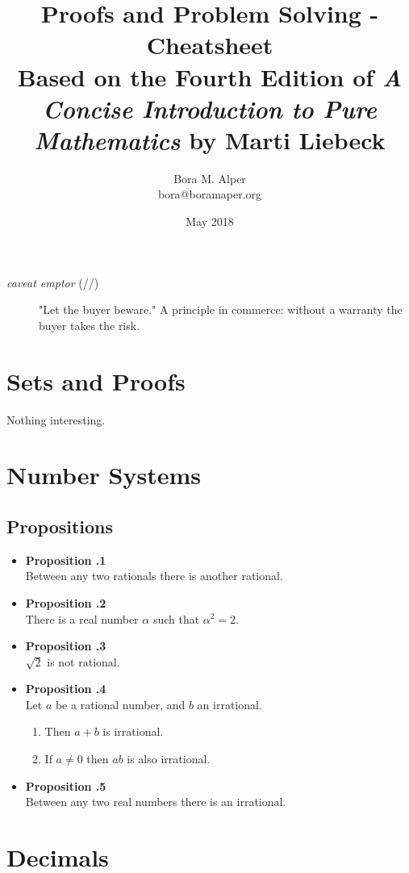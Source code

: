 \documentclass[a4paper,12pt]{article}
\title{Proofs and Problem Solving - Cheatsheet \\
\large Based on the Fourth Edition of \textit{A Concise Introduction to Pure Mathematics} by Marti Liebeck}
\author{Bora M. Alper\\bora@boramaper.org}
\date{May 2018}
\newcommand{\prop}[1]{
    \item \textbf{Proposition \thesection.#1}\\
}
\begin{document}
\maketitle
\begin{description}
    \item[\textit{caveat emptor} (//)] "Let the buyer beware." A principle in commerce: without a warranty the buyer takes the risk.
\end{description}

\tableofcontents


\section{Sets and Proofs}
Nothing interesting.

\section{Number Systems}
\subsection{Propositions}
\begin{itemize}
    \prop 1
    Between any two rationals there is another rational.
    
    \prop 2
    There is a real number $\alpha$ such that $\alpha^2 = 2$.
    
    \prop 3
    $\sqrt{2}$ is not rational.
    
    \prop 4
    Let $a$ be a rational number, and $b$ an irrational.
    \begin{enumerate}
        \item Then $a + b$ is irrational.
        \item If $a \not= 0$ then $ab$ is also irrational.
    \end{enumerate}
    
    \prop 5
    Between any two real numbers there is an irrational.
\end{itemize}

\section{Decimals}
\end{document}

